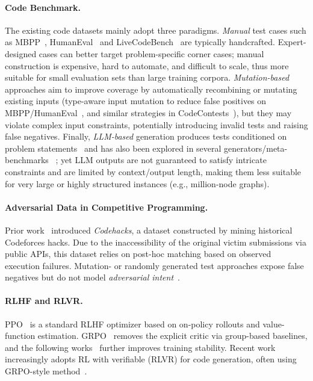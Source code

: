 \documentclass[11pt]{article}
\begin{document}
\paragraph{Code Benchmark.} The existing code datasets mainly adopt three paradigms.
\emph{Manual} test cases such as MBPP~\cite{mbpp}, HumanEval~\cite{humaneval} and  LiveCodeBench~\cite{livecodebench} are typically handcrafted. Expert-designed cases can better target problem-specific corner cases; manual construction is expensive, hard to automate, and difficult to scale, thus more suitable for small evaluation sets than large training corpora. \emph{Mutation-based} approaches aim to improve coverage by automatically recombining or mutating existing inputs (type-aware input mutation to reduce false positives on MBPP/HumanEval~\cite{NEURIPS2023_43e9d647}, and similar strategies in CodeContests~\cite{codecontest}), but they may violate complex input constraints, potentially introducing invalid tests and raising false negatives. Finally, \emph{LLM-based} generation produces tests conditioned on problem statements~\citep[e.g., Taco][]{taco} and has also been explored in several generators/meta-benchmarks~\citep[e.g., EvalPlus, HardTests, TestCase-Eval, LogiCase, and TCGBench][]{liu2023is,hardtest,testcaseeval,logicase,tcgbench}
; yet LLM outputs are not guaranteed to satisfy intricate constraints and are limited by context/output length, making them less suitable for very large or highly structured instances (e.g., million-node graphs).



\paragraph{Adversarial Data in Competitive Programming.}
Prior work~\cite{hort2025codehacks} introduced \textit{Codehacks}, a dataset constructed by mining historical Codeforces hacks.
Due to the inaccessibility of the original victim submissions via public APIs, this dataset relies on post-hoc matching based on observed execution failures.
Mutation- or randomly generated test approaches expose false negatives but do not model \textit{adversarial intent}~\cite{liu2023is,liu-etal-2025-llm}.

\paragraph{RLHF and RLVR.}
PPO~\cite{ppo} is a standard RLHF optimizer based on on-policy rollouts and value-function estimation. GRPO~\cite{shao2024deepseekmathpushinglimitsmathematical} removes the explicit critic via group-based baselines, and the following works~\cite{dapo, liu2025understanding} further improves training stability. Recent work increasingly adopts RL with verifiable (RLVR) for code generation, often using GRPO-style method~\cite{ekbote2025murphymultiturngrpoself,pennino2025reasoningcodegrpooptimization}.
\end{document}

